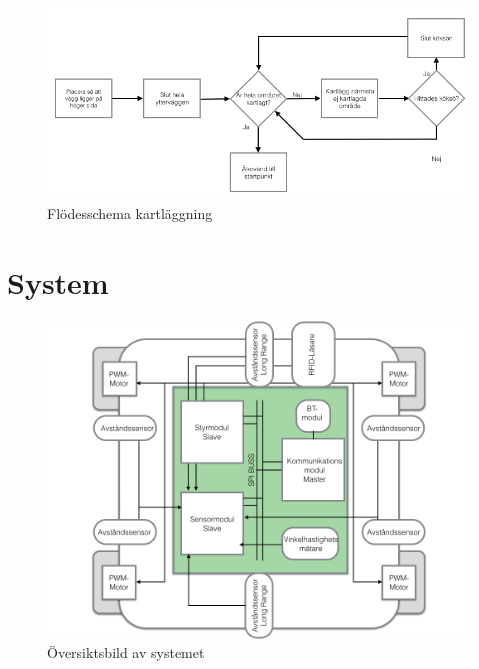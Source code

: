 \documentclass[a4paper,12pt,fleqn]{article}
\begin{document}
\begin{figure}[htp] %
  \begin{center}
  \includegraphics[keepaspectratio=true,scale=0.5]{bilder/Flode_kartritning.jpg}  %
  \end{center}
  \caption{Flödesschema kartläggning} %
  \label{fig:fire} %
\end{figure}

\newpage
\section{System}

\begin{figure}[htp] %
  \begin{center}
  \includegraphics[keepaspectratio=true,width=\linewidth]{bilder/overview}  %
  \end{center}
  \caption{Översiktsbild av systemet} %
  \label{fig:overview}
\end{figure}
\end{document}
